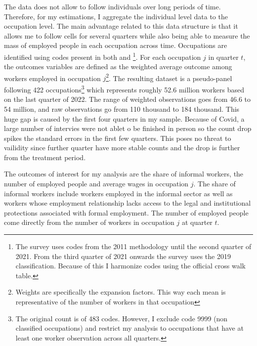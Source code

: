 The  data does not allow to follow individuals over long periods of time. Therefore, for my estimations, I aggregate the individual level data to the occupation level. The main advantage related to this data structure is that it allows me to follow cells for several quarters while also being able to measure the mass of employed people in each occupation across time. Occupations are identified using  codes present in both  and \footnote{The  survey uses  codes from the 2011 methodology until the second quarter of 2021. From the third quarter of 2021 onwards the survey uses the 2019  classification. Because of this I harmonize codes using the official  cross walk table.}. For each occupation $j$ in quarter $t$, the outcomes variables are defined as the weighted average outcome among workers employed in occupation $j$\footnote{Weights are specifically the  expansion factors. This way each mean is representative of the number of workers in that occupation}. The resulting dataset is a pseudo-panel following 422 occupations\footnote{The original count is of 483 codes. However, I exclude code 9999 (non classified occupations) and restrict my analysis to occupations that have at least one worker observation across all quarters.} which represents roughly 52.6 million workers based on the last quarter of 2022. The range of weighted observations goes from 46.6 to 54 million, and raw observations go from 110 thousand to 184 thousand. This huge gap is caused by the first four quarters in my sample. Because of Covid, a large number of intervies were not ablet o be finished in person so the count drop spikes the standard errors in the first few quarters. This poses no threat to vailidity since further quarter have more stable counts and the drop is further from the treatment period.

The outcomes of interest for my analysis are the share of informal workers, the number of employed people and average wages in occupation $j$. The share of informal workers include workers employed in the informal sector as well as workers whose employment relationship lacks access to the legal and institutional protections associated with formal employment. The number of employed people come directly from the number of workers in occupation $j$ at quarter $t$.

